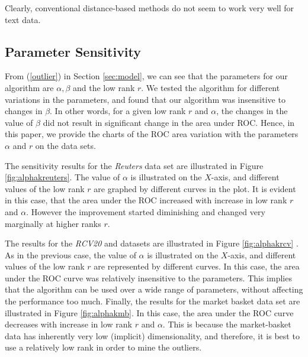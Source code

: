  Clearly, conventional
distance-based  methods do not seem to work very well for text data.

\subsection{Parameter Sensitivity}
From (\ref{outlier}) in Section \ref{sec:model}, we can
see that the parameters for our algorithm are $\alpha, \beta$ and
the low rank $r$. We tested the algorithm for different variations
in the parameters,  and found that our algorithm was insensitive to
changes in $\beta$. In other words,  for a given low rank $r$ and
$\alpha$, the changes in the value of  $\beta$ did not result in
significant change in the area under ROC. Hence, in this paper, we
provide the charts of the ROC area  variation with the parameters
$\alpha$ and $r$ on the data sets.

The  sensitivity results for the {\em Reuters} data set are
illustrated in Figure \ref{fig:alphakreuters}. The value of $\alpha$
is illustrated on the $X$-axis, and different values of the low rank
$r$ are graphed by different curves in the plot. It is evident in
this case, that the
 area under the  ROC increased with
increase in low rank $r$ and $\alpha$. However the improvement
started diminishing and changed very marginally at higher ranks $r$.

The results for the {\em RCV20} and  datasets are illustrated in Figure \ref{fig:alphakrcv} .
 As in the previous case, the value of $\alpha$ is illustrated on
 the $X$-axis, and  different values of the low rank $r$ are
 represented by different curves. In this case, the area under the
 ROC curve was relatively insensitive  to the parameters. This
 implies that the algorithm can be  used over a wide range of
 parameters, without affecting the performance too much.
Finally, the results for the market basket data set are illustrated
in  Figure \ref{fig:alphakmb}.  In this case, the area under the ROC
curve decreases with increase in low rank $r$ and $\alpha$. This is
because the market-basket data  has inherently very low (implicit)
dimensionality, and  therefore, it is best to use  a relatively low
rank in order to mine the outliers.

